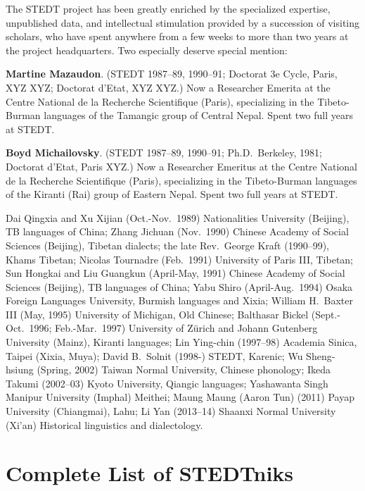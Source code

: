 The STEDT project has been greatly enriched by the specialized expertise, unpublished data, and intellectual stimulation provided by a succession of visiting scholars, who have spent anywhere from a few weeks to more than two years at the project headquarters. Two especially deserve special mention:

\textbf{Martine Mazaudon}. (STEDT 1987–89, 1990–91; Doctorat 3e Cycle, Paris, XYZ XYZ; Doctorat d’Etat, XYZ XYZ.) Now a Researcher Emerita at the Centre National de la Recherche Scientifique (Paris), specializing in the Tibeto-Burman languages of the Tamangic group of Central Nepal. Spent two full years at STEDT.

\textbf{Boyd Michailovsky}. (STEDT 1987–89, 1990–91; Ph.D.\ Berkeley, 1981; Doctorat d’Etat, Paris XYZ.) Now a Researcher Emeritus at the Centre National de la Recherche Scientifique (Paris), specializing in the Tibeto-Burman languages of the Kiranti (Rai) group of Eastern Nepal. Spent two full years at STEDT.

{\sc Dai} Qingxia and {\sc Xu} Xijian (Oct.-Nov.\ 1989) Nationalities University (Beijing), TB languages of China; {\sc Zhang} Jichuan (Nov.\ 1990) Chinese Academy of Social Sciences (Beijing), Tibetan dialects; the late Rev.\ George Kraft (1990–99), Khams Tibetan; Nicolas Tournadre (Feb.\ 1991) University of Paris III, Tibetan; {\sc Sun} Hongkai and {\sc Liu} Guangkun (April-May, 1991) Chinese Academy of Social Sciences (Beijing), TB languages of China; {\sc Yabu} Shiro (April-Aug.\ 1994) Osaka Foreign Languages University, Burmish languages and Xixia; William H.\ Baxter III (May, 1995) University of Michigan, Old Chinese; Balthasar Bickel (Sept.-Oct.\ 1996; Feb.-Mar.\ 1997) University of Z\"urich and Johann Gutenberg University (Mainz), Kiranti languages; {\sc Lin} Ying-chin (1997–98) Academia Sinica, Taipei (Xixia, Muya); David B.\ Solnit (1998-) STEDT, Karenic; {\sc Wu} Sheng-hsiung (Spring, 2002) Taiwan Normal University, Chinese phonology; {\sc Ikeda} Takumi (2002–03) Kyoto University, Qiangic languages; Yashawanta Singh  Manipur University (Imphal) Meithei; Maung Maung (Aaron Tun) (2011) Payap University (Chiangmai), Lahu; {\sc Li} Yan (2013–14) Shaanxi Normal University (Xi’an) Historical linguistics and dialectology.

\section{Complete List of STEDTniks}

